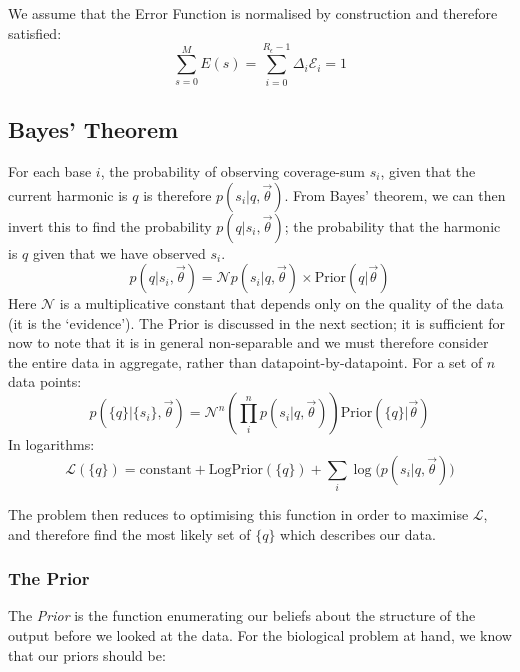 \documentclass[fleqn,usenatbib]{mnras}
\begin{document}
{					We assume that the Error Function is normalised by construction and therefore satisfied:
					\begin{equation}
						\sum_{s=0}^M E(s) = \sum_{i=0}^{R_\epsilon-1} \Delta_i \mathcal{E}_i = 1
					\end{equation}

					
				\subsection{Bayes' Theorem}

					For each base $i$, the probability of observing coverage-sum $s_i$, given that the current harmonic is $q$ is therefore $p(s_i | q, \vec{\theta})$. From Bayes' theorem, we can then invert this to find the probability $p(q | s_i, \vec{\theta})$; the probability that the harmonic is $q$ given that we have observed $s_i$.
					\begin{equation}
						p(q|s_i, \vec{\theta}) = \mathcal{N} {p(s_i | q, \vec{\theta}) \times \text{Prior}(q | \vec{\theta})}
					\end{equation}
					Here $\mathcal{N}$ is a multiplicative constant that depends only on the quality of the data (it is the `evidence'). The Prior is discussed in the next section; it is sufficient for now to note that it is in general non-separable and we must therefore consider the entire data in aggregate, rather than datapoint-by-datapoint. For a set of $n$ data points:
					\begin{equation}
						p( \{q\} | \{s_i\} , \vec{\theta}) = \mathcal{N}^n\left(\prod_i^n p(s_i | q, \vec{\theta}) \right) \text{Prior}(\{q\}| \vec{\theta})
					\end{equation}
					In logarithms:
					\begin{equation}
						\mathcal{L}(\{q\}) = \text{constant} + \text{LogPrior}(\{q\}) + \sum_i \log\big( p(s_i| q, \vec{\theta})\big) \label{E:Bayes}
					\end{equation}

					The problem then reduces to optimising this function in order to maximise $\mathcal{L}$, and therefore find the most likely set of $\{q\}$ which describes our data.
					
				\subsubsection{The Prior}


					The \textit{Prior} is the function enumerating our beliefs about the structure of the output before we looked at the data. For the biological problem at hand, we know that our priors should be:

}
\end{document}
